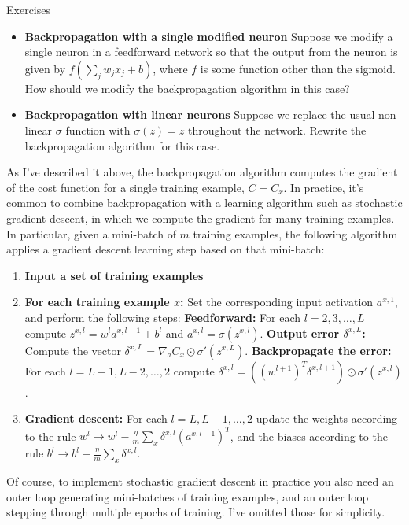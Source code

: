 \begin{exerciseBox}{Exercises}


\begin{itemize}

\item \textbf{Backpropagation with a single modified neuron} Suppose we modify a single neuron in a feedforward network so that the output from the neuron is given by $f(\sum_j w_j x_j + b)$, where $f$ is some function other than the sigmoid. How should we modify the backpropagation algorithm in this case?

\item \textbf{Backpropagation with linear neurons} Suppose we replace the usual non-linear $\sigma$ function with $\sigma(z) = z$ throughout the network. Rewrite the backpropagation algorithm for this case.

\end{itemize}


As I've described it above, the backpropagation algorithm computes the gradient of the cost function for a single training example, $C = C_x$. In practice, it's common to combine backpropagation with a learning algorithm such as stochastic gradient descent, in which we compute the gradient for many training examples. In particular, given a mini-batch of $m$ training examples, the following algorithm applies a gradient descent learning step based on that mini-batch:



\begin{enumerate}

\item \textbf{Input a set of training examples}

\item \textbf{For each training example $x$:} Set the corresponding input activation $a^{x,1}$, and perform the following steps: \textbf{Feedforward:} For each $l = 2, 3, \ldots, L$ compute $z^{x,l} = w^l a^{x,l-1}+b^l$ and $a^{x,l} = \sigma(z^{x,l})$. \textbf{Output error $\delta^{x,L}$:} Compute the vector $\delta^{x,L} = \nabla_a C_x \odot \sigma'(z^{x,L})$. \textbf{Backpropagate the error:} For each $l = L-1, L-2, \ldots, 2$ compute $\delta^{x,l} = ((w^{l+1})^T \delta^{x,l+1}) \odot \sigma'(z^{x,l})$.

\item \textbf{Gradient descent:} For each $l = L, L-1, \ldots, 2$ update the weights according to the rule $w^l \rightarrow w^l-\frac{\eta}{m} \sum_x \delta^{x,l} (a^{x,l-1})^T$, and the biases according to the rule $b^l \rightarrow b^l-\frac{\eta}{m} \sum_x \delta^{x,l}$.

\end{enumerate}


Of course, to implement stochastic gradient descent in practice you also need an outer loop generating mini-batches of training examples, and an outer loop stepping through multiple epochs of training. I've omitted those for simplicity.

\end{exerciseBox}



